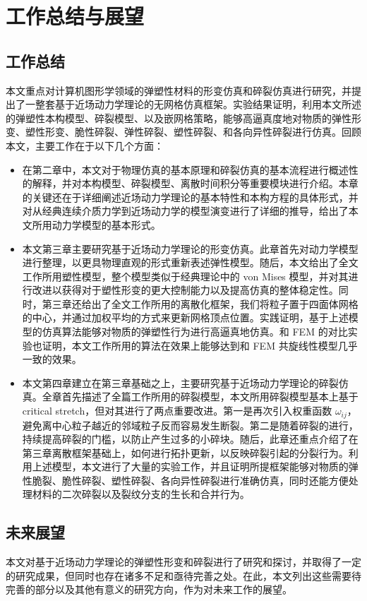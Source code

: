﻿\chapter{工作总结与展望}
\section{工作总结}
本文重点对计算机图形学领域的弹塑性材料的形变仿真和碎裂仿真进行研究，并提出了一整套基于近场动力学理论的无网格仿真框架。实验结果证明，利用本文所述的弹塑性本构模型、碎裂模型、以及嵌网格策略，能够高逼真度地对物质的弹性形变、塑性形变、脆性碎裂、弹性碎裂、塑性碎裂、和各向异性碎裂进行仿真。回顾本文，主要工作在于以下几个方面：

\begin{itemize}
  \item 在第二章中，本文对于物理仿真的基本原理和碎裂仿真的基本流程进行概述性的解释，并对本构模型、碎裂模型、离散时间积分等重要模块进行介绍。本章的关键还在于详细阐述近场动力学理论的基本特性和本构方程的具体形式，并对从经典连续介质力学到近场动力学的模型演变进行了详细的推导，给出了本文所用动力学模型的基本形式。
  \item 本文第三章主要研究基于近场动力学理论的形变仿真。此章首先对动力学模型进行整理，以更具物理直观的形式重新表述弹性模型。随后，本文给出了全文工作所用塑性模型，整个模型类似于经典理论中的 von Mises 模型，并对其进行改进以获得对于塑性形变的更大控制能力以及提高仿真的整体稳定性。同时，第三章还给出了全文工作所用的离散化框架，我们将粒子置于四面体网格的中心，并通过加权平均的方式来更新网格顶点位置。实践证明，基于上述模型的仿真算法能够对物质的弹塑性行为进行高逼真地仿真。和 FEM 的对比实验也证明，本文工作所用的算法在效果上能够达到和 FEM 共旋线性模型几乎一致的效果。
  \item 本文第四章建立在第三章基础之上，主要研究基于近场动力学理论的碎裂仿真。全章首先描述了全篇工作所用的碎裂模型，本文所用碎裂模型基本上基于 critical stretch，但对其进行了两点重要改进。第一是再次引入权重函数 $\omega_{ij}$，避免离中心粒子越近的邻域粒子反而容易发生断裂。第二是随着碎裂的进行，持续提高碎裂的门槛，以防止产生过多的小碎块。随后，此章还重点介绍了在第三章离散框架基础上，如何进行拓扑更新，以反映碎裂引起的分裂行为。利用上述模型，本文进行了大量的实验工作，并且证明所提框架能够对物质的弹性脆裂、脆性碎裂、塑性碎裂、各向异性碎裂进行准确仿真，同时还能方便处理材料的二次碎裂以及裂纹分支的生长和合并行为。
\end{itemize}

\section{未来展望}
本文对基于近场动力学理论的弹塑性形变和碎裂进行了研究和探讨，并取得了一定的研究成果，但同时也存在诸多不足和亟待完善之处。在此，本文列出这些需要待完善的部分以及其他有意义的研究方向，作为对未来工作的展望。

